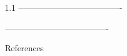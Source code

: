 \documentclass[final]{beamer}
\theoremstyle{plain}
\theoremstyle{definition}
\theoremstyle{remark}
\newlength{\threecolwid}
\begin{document}
\begin{frame}[t]
\begin{columns}[t]
\begin{column}{1.1\threecolwid}
-------------------------------------

-------------------------------------



\vspace{1.5cm}
\begin{alertblock}{References}

\nocite{*} %
\tiny{
 
 \vspace{0.4in}}

\end{alertblock}






\end{column} %

\end{columns} %

\end{frame} %
\end{document}
